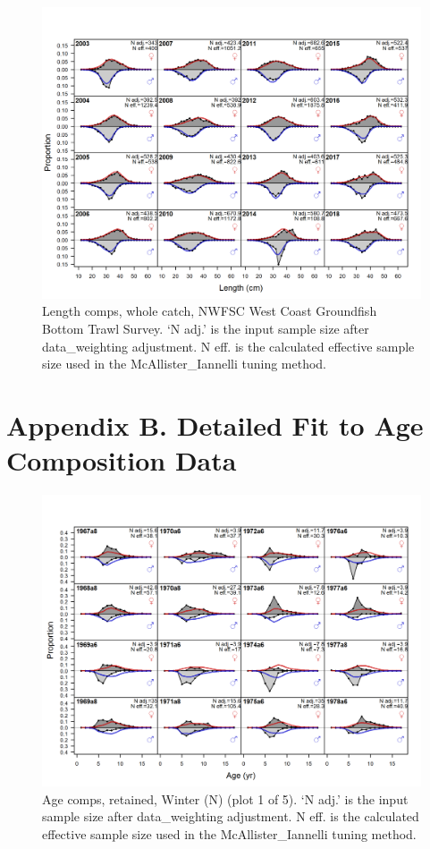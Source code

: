 \documentclass[12pt,]{article}
\begin{document}
\begin{figure}
\centering
\includegraphics{r4ss/plots_mod1/comp_lenfit_flt7mkt0.png}
\caption{Length comps, whole catch, NWFSC West Coast Groundfish Bottom
Trawl Survey. `N adj.' is the input sample size after data\_weighting
adjustment. N eff. is the calculated effective sample size used in the
McAllister\_Iannelli tuning method. \label{fig:length_fits}}
\end{figure}

\FloatBarrier

\section{Appendix B. Detailed Fit to Age Composition
Data}\label{appendix-b.-detailed-fit-to-age-composition-data}

\begin{figure}
\centering
\includegraphics{r4ss/plots_mod1/comp_agefit_flt1mkt2_page1.png}
\caption{Age comps, retained, Winter (N) (plot 1 of 5). `N adj.' is the
input sample size after data\_weighting adjustment. N eff. is the
calculated effective sample size used in the McAllister\_Iannelli tuning
method. \label{fig:age_fits}}
\end{figure}
\end{document}

